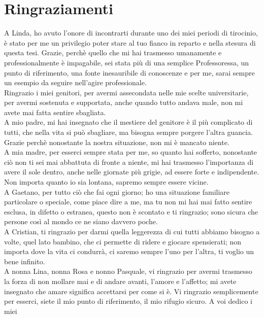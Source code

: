 \chapter*{Ringraziamenti}

A Linda, ho avuto l'onore di incontrarti durante uno dei miei periodi di tirocinio, è stato per me un privilegio poter
stare al tuo fianco in reparto e nella stesura di questa tesi. Grazie, perchè quello che mi hai trasmesso umanamente e
professionalmente è impagabile, sei stata più di una semplice Professoressa, un punto di riferimento,
una fonte inesauribile di conoscenze e per me, sarai sempre un esempio da seguire nell'agire professionale.\\
Ringrazio i miei genitori, per avermi assecondata nelle mie scelte universitarie, per avermi sostenuta e supportata,
anche quando tutto andava male, non mi avete mai fatta sentire sbagliata.\\
A mio padre, mi hai insegnato che il mestiere del genitore è il più complicato di tutti,
che nella vita si può sbagliare, ma bisogna sempre porgere l'altra guancia. Grazie perchè nonostante la nostra situazione,
non mi è mancato niente.\\
A mia madre, per esserci sempre stata per me, so quanto hai sofferto, nonostante ciò non ti sei mai abbattuta di fronte a 
niente, mi hai trasmesso l'importanza di avere il sole dentro, anche nelle giornate più grigie, ad essere forte e indipendente. 
Non importa quanto io sia lontana, sapremo sempre essere vicine.\\
A Gaetano, per tutto ciò che fai ogni giorno; ho una situazione familiare
particolare o speciale, come piace dire a me, ma tu non mi hai mai fatto sentire esclusa, in difetto o estranea,
questo non è scontato e ti ringrazio; sono sicura che persone così al mondo ce ne siano davvero poche.\\
A Cristian, ti ringrazio per darmi quella leggerezza di cui tutti abbiamo
bisogno a volte, quel lato bambino, che ci permette di ridere e giocare spensierati; non importa dove la vita ci condurrà, 
ci saremo sempre l'uno per l'altra, ti voglio un bene infinito.\\
A nonna Lina, nonna Rosa e nonno Pasquale, vi ringrazio per avermi trasmesso la forza di non mollare mai e di andare
avanti, l'amore e l'affetto; mi avete insegnato che amare significa accettarsi per come si è. Vi
ringrazio semplicemente per esserci, siete il mio punto di riferimento, il mio rifugio sicuro. A voi dedico i miei
